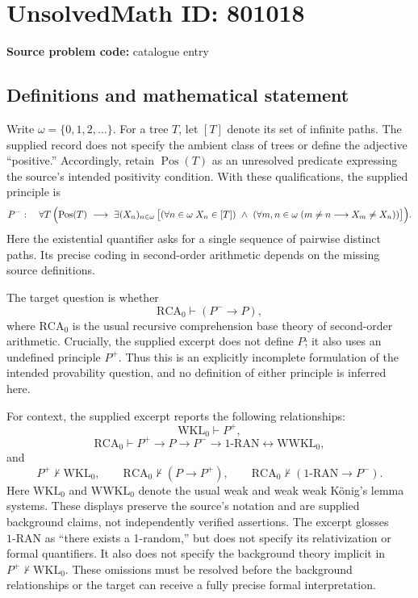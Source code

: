 \documentclass[11pt]{article}
\begin{document}
\section*{UnsolvedMath ID: 801018}
\textbf{Source problem code:} catalogue entry
\subsection{Definitions and mathematical statement}
Write \(\omega=\{0,1,2,\ldots\}\). For a tree \(T\), let \([T]\) denote its set of infinite paths. The supplied record does not specify the ambient class of trees or define the adjective ``positive.'' Accordingly, retain \(\operatorname{Pos}(T)\) as an unresolved predicate expressing the source's intended positivity condition. With these qualifications, the supplied principle is
\[
P^-:\quad \forall T\,\Bigl(\operatorname{Pos}(T)\ \longrightarrow\ \exists (X_n)_{n\in\omega}\,\bigl[(\forall n\in\omega\;X_n\in[T])\ \land\ (\forall m,n\in\omega\;(m\ne n\longrightarrow X_m\ne X_n))\bigr]\Bigr).
\]
Here the existential quantifier asks for a single sequence of pairwise distinct paths. Its precise coding in second-order arithmetic depends on the missing source definitions.

The target question is whether
\[
\mathrm{RCA}_0\vdash (P^-\longrightarrow P),
\]
where \(\mathrm{RCA}_0\) is the usual recursive comprehension base theory of second-order arithmetic. Crucially, the supplied excerpt does not define \(P\); it also uses an undefined principle \(P^+\). Thus this is an explicitly incomplete formulation of the intended provability question, and no definition of either principle is inferred here.

For context, the supplied excerpt reports the following relationships:
\[
\mathrm{WKL}_0\vdash P^+,
\]
\[
\mathrm{RCA}_0\vdash P^+\to P\to P^-\to\mathrm{1\text{-}RAN}\leftrightarrow\mathrm{WWKL}_0,
\]
and
\[
P^+\nvdash\mathrm{WKL}_0,\qquad
\mathrm{RCA}_0\nvdash(P\to P^+),\qquad
\mathrm{RCA}_0\nvdash(\mathrm{1\text{-}RAN}\to P^-).
\]
Here \(\mathrm{WKL}_0\) and \(\mathrm{WWKL}_0\) denote the usual weak and weak weak K\"onig's lemma systems. These displays preserve the source's notation and are supplied background claims, not independently verified assertions. The excerpt glosses \(\mathrm{1\text{-}RAN}\) as ``there exists a 1-random,'' but does not specify its relativization or formal quantifiers. It also does not specify the background theory implicit in \(P^+\nvdash\mathrm{WKL}_0\). These omissions must be resolved before the background relationships or the target can receive a fully precise formal interpretation.
\end{document}
